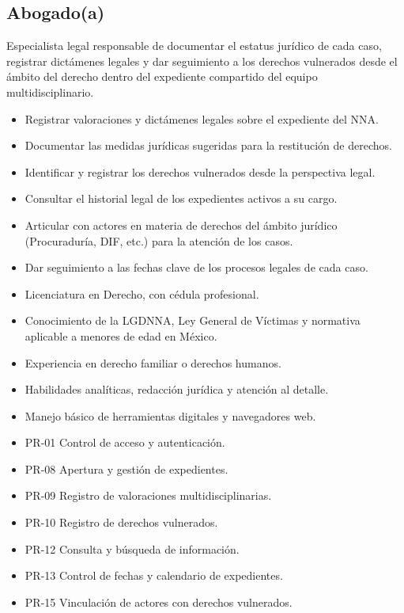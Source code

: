 \begin{Usuario}{\hypertarget{A.Abogado}{\subsection{Abogado(a)}}}{
		Especialista legal responsable de documentar el estatus jurídico 
		de cada caso, registrar dictámenes legales y dar seguimiento a los 
		derechos vulnerados desde el ámbito del derecho dentro del expediente 
		compartido del equipo multidisciplinario.
	}
	\item[Responsabilidades:] \cdtEmpty
	\begin{itemize}
		\item Registrar valoraciones y dictámenes legales sobre el 
		expediente del NNA.
		\item Documentar las medidas jurídicas sugeridas para la 
		restitución de derechos.
		\item Identificar y registrar los derechos vulnerados desde 
		la perspectiva legal.
		\item Consultar el historial legal de los expedientes activos 
		a su cargo.
		\item Articular con actores en materia de derechos del ámbito 
		jurídico (Procuraduría, DIF, etc.) para la atención de los casos.
		\item Dar seguimiento a las fechas clave de los procesos legales 
		de cada caso.
	\end{itemize}
	
	\item[Perfil:] \cdtEmpty
	\begin{itemize}
		\item Licenciatura en Derecho, con cédula profesional.
		\item Conocimiento de la LGDNNA, Ley General de Víctimas y 
		normativa aplicable a menores de edad en México.
		\item Experiencia en derecho familiar o derechos humanos.
		\item Habilidades analíticas, redacción jurídica y atención 
		al detalle.
		\item Manejo básico de herramientas digitales y navegadores web.
	\end{itemize}
	
	\item[Procesos en los que participa:] \cdtEmpty
	\begin{itemize}
		\item PR-01 Control de acceso y autenticación.
		\item PR-08 Apertura y gestión de expedientes.
		\item PR-09 Registro de valoraciones multidisciplinarias.
		\item PR-10 Registro de derechos vulnerados.
		\item PR-12 Consulta y búsqueda de información.
		\item PR-13 Control de fechas y calendario de expedientes.
		\item PR-15 Vinculación de actores con derechos vulnerados.
	\end{itemize}
	

\end{Usuario}
